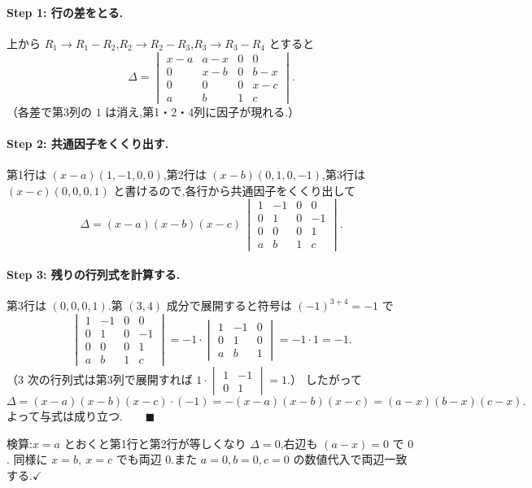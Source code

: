\documentclass[11pt,a4paper]{article}
\begin{document}
\paragraph{Step 1: 行の差をとる.}
上から $R_1\to R_1-R_2$,$R_2\to R_2-R_3$,$R_3\to R_3-R_4$ とすると
\[
\Delta=\begin{vmatrix}
x-a&a-x&0&0\\
0&x-b&0&b-x\\
0&0&0&x-c\\
a&b&1&c
\end{vmatrix}.
\]
（各差で第3列の $1$ は消え,第1・2・4列に因子が現れる.）

\paragraph{Step 2: 共通因子をくくり出す.}
第1行は $(x-a)(1,-1,0,0)$,第2行は $(x-b)(0,1,0,-1)$,第3行は $(x-c)(0,0,0,1)$
と書けるので,各行から共通因子をくくり出して
\[
\Delta=(x-a)(x-b)(x-c)\,
\begin{vmatrix}
1&-1&0&0\\
0&1&0&-1\\
0&0&0&1\\
a&b&1&c
\end{vmatrix}.
\]

\paragraph{Step 3: 残りの行列式を計算する.}
第3行は $(0,0,0,1)$.第 $(3,4)$ 成分で展開すると符号は $(-1)^{3+4}=-1$ で
\[
\begin{vmatrix}1&-1&0&0\\0&1&0&-1\\0&0&0&1\\a&b&1&c\end{vmatrix}
=-1\cdot\begin{vmatrix}1&-1&0\\0&1&0\\a&b&1\end{vmatrix}
=-1\cdot 1=-1.
\]
（$3$ 次の行列式は第3列で展開すれば $1\cdot\begin{vmatrix}1&-1\\0&1\end{vmatrix}=1$.）
したがって
\[
\Delta=(x-a)(x-b)(x-c)\cdot(-1)=-(x-a)(x-b)(x-c)=(a-x)(b-x)(c-x).
\]
よって与式は成り立つ.$\qquad\blacksquare$

検算:$x=a$ とおくと第1行と第2行が等しくなり $\Delta=0$,右辺も $(a-x)=0$ で $0$.
同様に $x=b,\ x=c$ でも両辺 $0$.また $a=0,b=0,c=0$ の数値代入で両辺一致する.$\checkmark$
\end{document}
